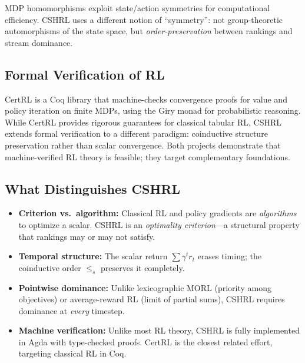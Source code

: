 \documentclass[9pt,a4paper]{article}
\theoremstyle{plain}
\theoremstyle{definition}
\theoremstyle{remark}
\begin{document}
MDP homomorphisms \cite{vanderPol2020} exploit state/action symmetries for computational efficiency. CSHRL uses a different notion of ``symmetry'': not group-theoretic automorphisms of the state space, but \emph{order-preservation} between rankings and stream dominance.

\subsection{Formal Verification of RL}

CertRL \cite{Lesage2020} is a Coq library that machine-checks convergence proofs for value and policy iteration on finite MDPs, using the Giry monad for probabilistic reasoning. While CertRL provides rigorous guarantees for classical tabular RL, CSHRL extends formal verification to a different paradigm: coinductive structure preservation rather than scalar convergence. Both projects demonstrate that machine-verified RL theory is feasible; they target complementary foundations.

\subsection{What Distinguishes CSHRL}

\begin{itemize}
\item \textbf{Criterion vs.\ algorithm:} Classical RL and policy gradients are \emph{algorithms} to optimize a scalar. CSHRL is an \emph{optimality criterion}---a structural property that rankings may or may not satisfy.
\item \textbf{Temporal structure:} The scalar return $\sum \gamma^t r_t$ erases timing; the coinductive order $\le_s$ preserves it completely.
\item \textbf{Pointwise dominance:} Unlike lexicographic MORL (priority among objectives) or average-reward RL (limit of partial sums), CSHRL requires dominance at \emph{every} timestep.
\item \textbf{Machine verification:} Unlike most RL theory, CSHRL is fully implemented in Agda with type-checked proofs. CertRL \cite{Lesage2020} is the closest related effort, targeting classical RL in Coq.
\end{itemize}

\end{document}
